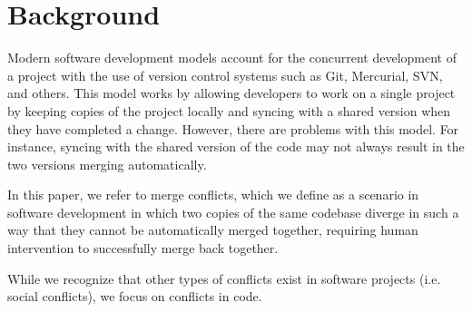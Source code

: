 \section{Background}\label{background}

Modern software development models account for the concurrent development of a project with the use of version control systems such as Git, Mercurial, SVN, and others. This model works by allowing developers to work on a single project by keeping copies of the project locally and syncing with a shared version when they have completed a change. However, there are problems with this model. For instance, syncing with the shared version of the code may not always result in the two versions merging automatically.

In this paper, we refer to merge conflicts, which we define as a scenario in software development in which two copies of the same codebase diverge in such a way that they cannot be automatically merged together, requiring human intervention to successfully merge back together. 

While we recognize that other types of conflicts exist in software projects (i.e. social conflicts), we focus on conflicts in code.